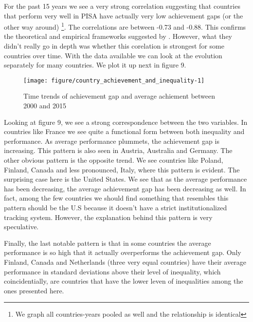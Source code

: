 \documentclass[11pt, a4paper]{article}\usepackage[]{graphicx}\usepackage[]{color}
\begin{document}
For the past 15 years we see a very strong correlation suggesting that countries that perform very well in PISA have actually very low achievement gaps (or the other way around) \footnote{We graph all countries-years pooled as well and the relationship is identical}. The correlations are between -0.73 and -0.88. This confirms the theoretical and empirical frameworks suggested by \citet{werfhorst_mijs}. However, what they didn't really go in depth was whether this corelation is strongest for some countries over time. With the data available we can look at the evolution separately for many countries. We plot it up next in figure 9.

\begin{figure}
\begin{center}


{\centering \texttt{[image: figure/country\_achievement\_and\_inequality-1]} 

}



\caption{Time trends of achievement gap and average achiement between 2000 and 2015}
\end{center}
\end{figure}

Looking at figure 9, we see a strong correspondence between the two variables. In countries like France we see quite a functional form between both inequality and performance. As average performance plummets, the achievement gap is increasing. This pattern is also seen in Austria, Australia and Germany. The other obvious pattern is the opposite trend. We see countries like Poland, Finland, Canada and less pronounced, Italy, where this pattern is evident. The surprising case here is the United States. We see that as the average performance has been decreasing, the average achievement gap has been decreasing as well. In fact, among the few countries we should find something that resembles this pattern should be the U.S because it doesn't have a strict institutionalized tracking system. However, the explanation behind this pattern is very speculative.

Finally, the last notable pattern is that in some countries the average performance is so high that it actually overperforms the achievement gap. Only Finland, Canada and Netherlands (three very equal countries) have their average performance in standard deviations above their level of inequality, which coincidentially, are countries that have the lower leven of inequalities among the ones presented here.




\end{document}
